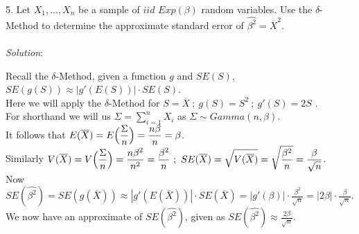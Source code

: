 \documentclass[12pt]{article}
\newcommand{\XB}{\color{black}}
\newcommand{\XBB}{\color{blue}}
\newcommand{\XV}{\color{violet}}
\begin{document}
\XBB\hrulefill\XB \\

5. Let $ X_{1}, \dots, X_{n} $ be a sample of $ iid $ $ Exp(\beta) $ random variables. Use the $ \delta $-Method to determine the approximate standard error of $ \hat{\beta^{2}} = \overline{X}^{2} $. \\

\XBB\hrulefill\XB 
\vspace{5mm} \\


\textit{Solution}:
\vspace{2.5mm}

\noindent 
Recall the $ \delta $-Method, given a function $ g $ and $ SE(S) $, $ SE(g(S)) \approx |g'(E(S))| \cdot SE(S) $. \\

\noindent
Here we will apply the $ \delta $-Method for $ S = \overline{X} \ ; \ g(S) = S^{2} \ ; \ g'(S) = 2S $ . \\

\noindent
For shorthand we will us $ \displaystyle \Sigma = \sum_{i=1}^{n} X_{i} $ as $ \Sigma \sim Gamma(n, \beta) $. \\ 

\noindent
It follows that $ \displaystyle E(\overline{X}) = E\Bigl( \frac{\Sigma}{n} \Bigr) = \frac{n\beta}{n} = \beta $. \\

\noindent
Similarly $ \displaystyle V(\overline{X}) = V\Bigl( \frac{\Sigma}{n} \Bigr) = \frac{n\beta^{2}}{n^{2}} = \frac{\beta^{2}}{n} \ ; \ SE(\overline{X}) = \sqrt{V(\overline{X})} = \sqrt{\frac{\beta^{2}}{n}} = \frac{\beta}{\sqrt{n}} $. \\

\noindent
Now $ \displaystyle SE(\hat{\beta^{2}}) = SE(g(\overline{X})) \approx |g'(E(\overline{X}))| \cdot SE(\overline{X}) = |g'(\beta)| \cdot \frac{\beta^{2}}{\sqrt{n}} = |2\beta| \cdot \frac{\beta}{\sqrt{n}}  $. \\

\noindent
We now have an approximate of $ SE(\hat{\beta^{2}}) $, given as $ \displaystyle SE(\hat{\beta^{2}}) \approx \frac{2\beta}{\sqrt{n}} $. \\

\end{document}
